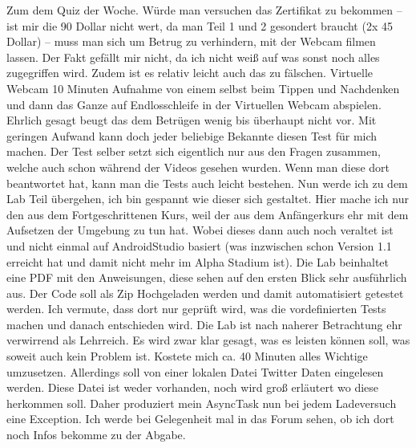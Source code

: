\documentclass[12pt,a4paper,bibliography=totocnumbered,listof=totocnumbered]{scrartcl}
\begin{document}
Zum dem Quiz der Woche. 
Würde man versuchen das Zertifikat zu bekommen – ist mir die 90 Dollar nicht wert, da man Teil 1 und 2 gesondert braucht (2x 45 Dollar) – muss man sich um Betrug zu verhindern, mit der Webcam filmen lassen. Der Fakt gefällt mir nicht, da ich nicht weiß auf was sonst noch alles zugegriffen wird. Zudem ist es relativ leicht auch das zu fälschen. Virtuelle Webcam 10 Minuten Aufnahme von einem selbst beim Tippen und Nachdenken und dann das Ganze auf Endlosschleife in der Virtuellen Webcam abspielen. Ehrlich gesagt beugt das dem Betrügen  wenig bis überhaupt nicht vor.  Mit geringen Aufwand kann doch jeder beliebige Bekannte diesen Test für mich machen. 
Der Test selber setzt sich eigentlich nur aus den Fragen zusammen, welche auch schon während der Videos gesehen wurden. Wenn man diese dort beantwortet hat, kann man die Tests auch leicht bestehen. 
Nun werde ich zu dem Lab Teil übergehen, ich bin gespannt wie dieser sich gestaltet. Hier mache ich nur den aus dem Fortgeschrittenen Kurs, weil der aus dem Anfängerkurs ehr mit dem Aufsetzen der Umgebung zu tun hat. Wobei dieses dann auch noch veraltet ist und nicht einmal auf AndroidStudio basiert (was inzwischen schon Version 1.1 erreicht hat und damit nicht mehr im Alpha Stadium ist).
Die Lab beinhaltet eine PDF mit den Anweisungen, diese sehen auf den ersten Blick sehr ausführlich aus. Der Code soll als Zip Hochgeladen werden und damit automatisiert getestet werden. Ich vermute, dass dort nur geprüft wird, was die vordefinierten Tests machen und danach entschieden wird. 
Die Lab ist nach naherer Betrachtung ehr verwirrend als Lehrreich. Es wird zwar klar gesagt, was es leisten können soll, was soweit auch kein Problem ist. Kostete mich ca. 40 Minuten alles Wichtige umzusetzen. Allerdings soll von einer lokalen Datei Twitter Daten eingelesen werden. Diese Datei ist weder vorhanden, noch wird groß erläutert wo diese herkommen soll. Daher produziert mein AsyncTask nun bei jedem Ladeversuch eine Exception. Ich werde bei Gelegenheit mal in das Forum sehen, ob ich dort noch Infos bekomme zu der Abgabe. 
\end{document}
